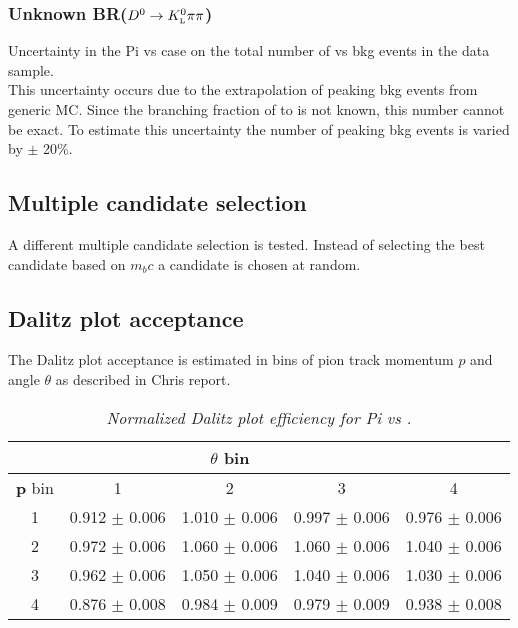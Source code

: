 \subsubsection{Unknown BR($D^0 \rightarrow {\ensuremath{K^0_{\rm\scriptscriptstyle L}}}{\ensuremath{\pi}}\pi$)}
\label{s:peakc}
Uncertainty in the \4Pi vs \KlPiPi case on the total number of \KlPiPi vs \KlPiPi bkg events in the data sample.\\
	This uncertainty occurs due to the extrapolation of peaking bkg events from generic MC. Since the branching fraction of \D to \KlPiPi is not known, this number cannot be exact. To estimate this uncertainty the number of peaking bkg events is varied by $\pm$ 20\%.\\



\subsection{Multiple candidate selection}
\label{s:mcs}
A different multiple candidate selection is tested. Instead of selecting the best candidate based on $m_bc$ a candidate is chosen at random.\\

\subsection{Dalitz plot acceptance}
\label{s:dpa}
The Dalitz plot acceptance is estimated in bins of pion track momentum $p$ and angle $\theta$ as described in Chris report.\\
\begin{table}[h!]
\begin{center}
\begin{tabular}{c | c c c c}
&  & $ \theta$ bin \\
\hline
\textbf{p} bin & 1 & 2 & 3 & 4\\ 
\hline
1 & 0.912 $\pm$ 0.006 & 1.010 $\pm$ 0.006 & 0.997 $\pm$ 0.006 & 0.976 $\pm$ 0.006 \\ 
2 & 0.972 $\pm$ 0.006 & 1.060 $\pm$ 0.006 & 1.060 $\pm$ 0.006 & 1.040 $\pm$ 0.006 \\ 
3 & 0.962 $\pm$ 0.006 & 1.050 $\pm$ 0.006 & 1.040 $\pm$ 0.006 & 1.030 $\pm$ 0.006 \\ 
4 & 0.876 $\pm$ 0.008 & 0.984 $\pm$ 0.009 & 0.979 $\pm$ 0.009 & 0.938 $\pm$ 0.008 \\ 
\end{tabular}
\end{center}
\caption{\textit{Normalized Dalitz plot efficiency for \4Pi vs \KsPiPi.}}
\end{table}


